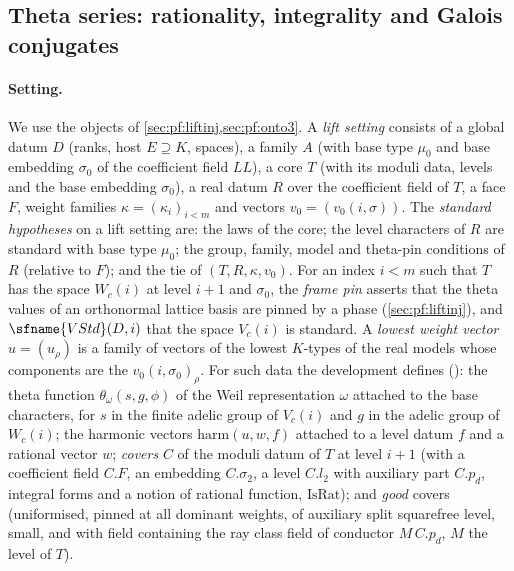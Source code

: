 \subsection{Theta series: rationality, integrality and Galois conjugates}\label{sec:pf:sh-div:theta}

\paragraph{Setting.} We use the objects of \cref{sec:pf:liftinj,sec:pf:onto3}. A \emph{lift setting} consists of a global datum
$D$ (ranks, host $E\supseteq K$, spaces), a family $A$ (with base type $\mu_0$ and base embedding $\sigma_0$ of the coefficient field
$\mathit{LL}$), a core $T$ (with its moduli data, levels and the base embedding $\sigma_0$), a real datum $R$ over the coefficient field
of $T$, a face $F$, weight families $\kappa=(\kappa_i)_{i<m}$ and vectors $v_0=(v_0(i,\sigma))$. The \emph{standard hypotheses} on a
lift setting are: the laws of the core; the level characters of $R$ are standard with base type $\mu_0$; the group, family, model
and theta-pin conditions of $R$ (relative to $F$); and the tie of $(T,R,\kappa,v_0)$. For an index $i<m$ such that $T$ has the space
$W_c(i)$ at level $i+1$ and $\sigma_0$, the \emph{frame pin} asserts that the theta values of an orthonormal lattice basis are pinned
by a phase (\cref{sec:pf:liftinj}), and $\sfname{VStd}(D,i)$ that the space $V_c(i)$ is standard. A \emph{lowest weight vector}
$u=(u_\rho)$ is a family of vectors of the lowest $K$-types of the real models whose components are the $v_0(i,\sigma_0)_\rho$. For
such data the development defines (\cite{LeanSource2026}): the theta function $\theta_\omega(s,g,\phi)$ of the Weil representation
$\omega$ attached to the base characters, for $s$ in the finite adelic group of $V_c(i)$ and $g$ in the adelic group of $W_c(i)$;
the harmonic vectors $\mathrm{harm}(u,w,f)$ attached to a level datum $f$ and a rational vector $w$; \emph{covers} $C$ of the moduli
datum of $T$ at level $i+1$ (with a coefficient field $C.F$, an embedding $C.\sigma_2$, a level $C.l_2$ with auxiliary part
$C.p_d$, integral forms and a notion of rational function, $\mathrm{IsRat}$); and \emph{good} covers (uniformised, pinned at all
dominant weights, of auxiliary split squarefree level, small, and with field containing the ray class field of conductor
$M\,C.p_d$, $M$ the level of $T$).

